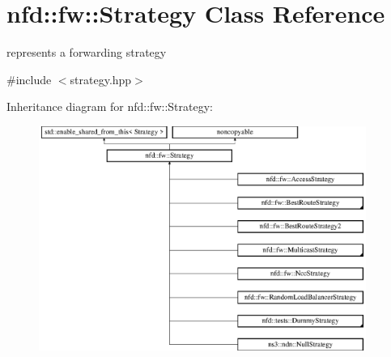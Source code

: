 \hypertarget{classnfd_1_1fw_1_1Strategy}{}\section{nfd\+:\+:fw\+:\+:Strategy Class Reference}
\label{classnfd_1_1fw_1_1Strategy}


represents a forwarding strategy  




{\ttfamily \#include $<$strategy.\+hpp$>$}

Inheritance diagram for nfd\+:\+:fw\+:\+:Strategy\+:\begin{figure}[H]
\begin{center}
\leavevmode
\includegraphics[height=7.320261cm]{classnfd_1_1fw_1_1Strategy}
\end{center}
\end{figure}
